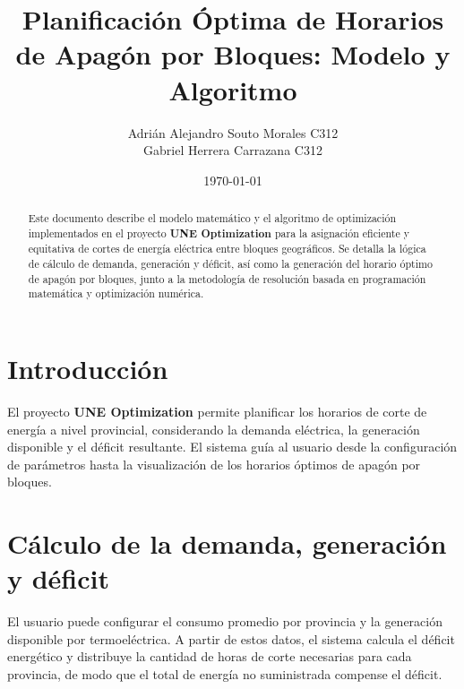\documentclass[a4paper,12pt]{article}
\title{Planificación Óptima de Horarios de Apagón por Bloques: Modelo y Algoritmo}
\author{Adrián Alejandro Souto Morales C312 \\ Gabriel Herrera Carrazana C312}
\date{\today}
\begin{document}
\maketitle

\begin{abstract}
Este documento describe el modelo matemático y el algoritmo de optimización implementados en el proyecto \textbf{UNE Optimization} para la asignación eficiente y equitativa de cortes de energía eléctrica entre bloques geográficos. Se detalla la lógica de cálculo de demanda, generación y déficit, así como la generación del horario óptimo de apagón por bloques, junto a la metodología de resolución basada en programación matemática y optimización numérica.
\end{abstract}

\section{Introducción}
El proyecto \textbf{UNE Optimization} permite planificar los horarios de corte de energía a nivel provincial, considerando la demanda eléctrica, la generación disponible y el déficit resultante. El sistema guía al usuario desde la configuración de parámetros hasta la visualización de los horarios óptimos de apagón por bloques.

\section{Cálculo de la demanda, generación y déficit}
El usuario puede configurar el consumo promedio por provincia y la generación disponible por termoeléctrica. A partir de estos datos, el sistema calcula el déficit energético y distribuye la cantidad de horas de corte necesarias para cada provincia, de modo que el total de energía no suministrada compense el déficit.
\end{document}
